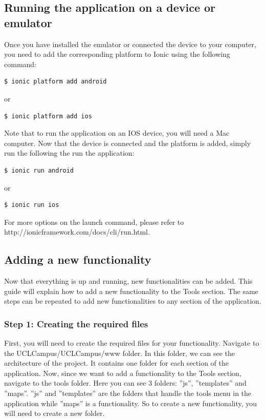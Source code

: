\documentclass[11pt, a4paper]{report}
\begin{document}
\subsection{Running the application on a device or emulator}

Once you have installed the emulator or connected the device to your computer, you need to add the corresponding platform to Ionic using the following command:

\begin{lstlisting}[language=bash]
   $ ionic platform add android
\end{lstlisting} 

or

\begin{lstlisting}[language=bash]
   $ ionic platform add ios
\end{lstlisting} 

Note that to run the application on an IOS device, you will need a Mac computer. Now that the device is connected and the platform is added, simply run the following the run the application:

\begin{lstlisting}[language=bash]
   $ ionic run android
\end{lstlisting} 

or 

\begin{lstlisting}[language=bash]
   $ ionic run ios
\end{lstlisting} 

For more options on the launch command, please refer to http://ionicframework.com/docs/cli/run.html.

\subsection{Adding a new functionality}

Now that everything is up and running, new functionalities can be added. This guide will explain how to add a new functionality to the Tools section. The same steps can be repeated to add new functionalities to any section of the application.

\subsubsection{Step 1: Creating the required files}

First, you will need to create the required files for your functionality. Navigate to the UCLCampus/UCLCampus/www folder. In this folder, we can see the architecture of the project. It contains one folder for each section of the application. Now, since we want to add a functionality to the Tools section, navigate to the tools folder. Here you can see 3 folders: ''js'', ''templates'' and ''maps''. ''js'' and ''templates'' are the folders that handle the tools menu in the application while ''maps'' is a functionality. So to create a new functionality, you will need to create a new folder.
\end{document}
